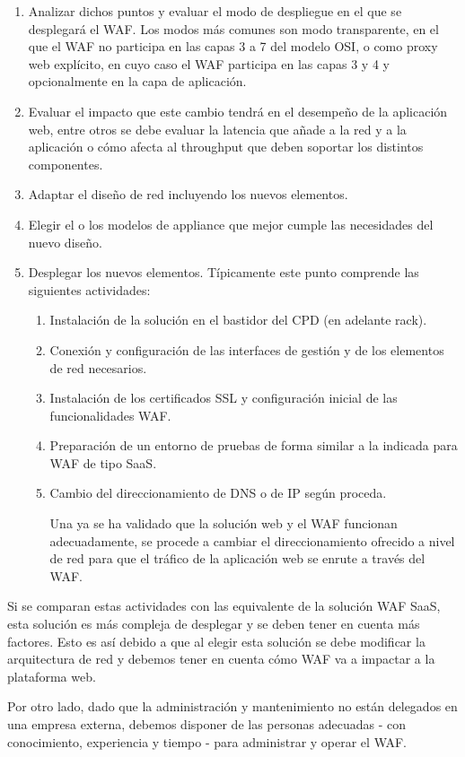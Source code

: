 \begin{enumerate}
  \item Analizar dichos puntos y evaluar el modo de despliegue en el que se desplegará el WAF. Los modos más comunes son modo transparente, en
    el que el WAF no participa en las capas 3 a 7 del modelo OSI, o como proxy web explícito, en cuyo caso el WAF participa en las capas 3 y 4
    y opcionalmente en la capa de aplicación.
  \item Evaluar el impacto que este cambio tendrá en el desempeño de la aplicación web, entre otros se debe evaluar la latencia que añade a la
    red y a la aplicación o cómo afecta al throughput que deben soportar los distintos componentes.
  \item Adaptar el diseño de red incluyendo los nuevos elementos.
  \item Elegir el o los modelos de appliance que mejor cumple las necesidades del nuevo diseño.
  \item Desplegar los nuevos elementos. Típicamente este punto comprende las siguientes actividades:
    \begin{enumerate}
      \item Instalación de la solución en el bastidor del CPD (en adelante rack).
      \item Conexión y configuración de las interfaces de gestión y de los elementos de red necesarios.
      \item Instalación de los certificados SSL y configuración inicial de las funcionalidades WAF.
      \item Preparación de un entorno de pruebas de forma similar a la indicada para WAF de tipo SaaS.
      \item Cambio del direccionamiento de DNS o de IP según proceda.
        \par Una ya se ha validado que la solución web y el WAF funcionan adecuadamente, se procede a cambiar el direccionamiento ofrecido a nivel
        de red para que el tráfico de la aplicación web se enrute a través del WAF.
    \end{enumerate}
\end{enumerate}

\par Si se comparan estas actividades con las equivalente de la solución WAF SaaS, esta solución es más compleja de desplegar y se deben tener
en cuenta más factores. Esto es así debido a que al elegir esta solución se debe modificar la arquitectura de red y debemos tener en cuenta
cómo WAF va a impactar a la plataforma web.
\par Por otro lado, dado que la administración y mantenimiento no están delegados en una empresa externa, debemos disponer de las personas
adecuadas - con conocimiento, experiencia y tiempo - para administrar y operar el WAF.

